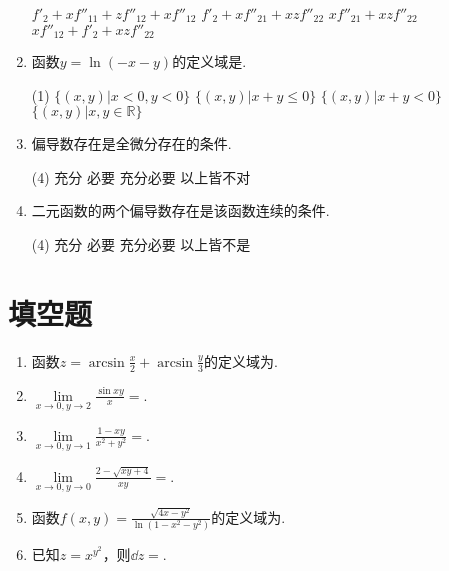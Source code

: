 \begin{enumerate}
\begin{choice}
			\choice $ f'_2 + xf''_{11} +zf''_{12} + xf''_{12} $
			\choice $ f'_2 + xf''_{21} + xzf''_{22} $
			\choice $ xf''_{21}+ xzf''_{22} $
			\choice $ xf''_{12} + f'_2 + xzf''_{22} $
		\end{choice}
	\item 函数$ y=\ln(-x-y) $的定义域是\emptychoice .
		\begin{choice}(1)
			\choice $ \{ (x,y)|x<0,y<0 \} $
			\choice $ \{ (x,y)|x+y\leqslant 0 \} $
			\choice $ \{ (x,y)|x+y<0 \} $
			\choice $ \{ (x,y)|x,y\in \mathbb{R} \} $
		\end{choice}
	\item 偏导数存在是全微分存在的\emptychoice 条件.
		\begin{choice}(4)
			\choice 充分
			\choice 必要
			\choice 充分必要
			\choice 以上皆不对
		\end{choice}
	\item 二元函数的两个偏导数存在是该函数连续的\emptychoice 条件.
		\begin{choice}(4)
			\choice 充分
			\choice 必要
			\choice 充分必要
			\choice 以上皆不是
		\end{choice}
\end{enumerate}
\section{填空题}
\begin{enumerate}
	\item 函数$z=\arcsin \frac{x}{2} + \arcsin \frac{y}{3} $的定义域为\blank .
	\item $\lim\limits_{x\rightarrow 0,y\rightarrow 2} \frac{\sin xy}{x} = $\blank .
	\item $ \lim\limits_{x\to 0,y\to 1} \frac{1- xy}{x^2+y^2} =$\blank .
	\item $ \lim\limits_{x\to 0,y\to 0} \frac{2-\sqrt{xy+4}}{xy} = $\blank .
	\item 函数$ f(x,y)=\frac{\sqrt{4x-y^2}}{\ln(1-x^2-y^2)} $的定义域为\blank[9em].
	\item 已知$ z=x^{y^2} $，则$ \dd z = $\blank[9em].
\end{enumerate}
